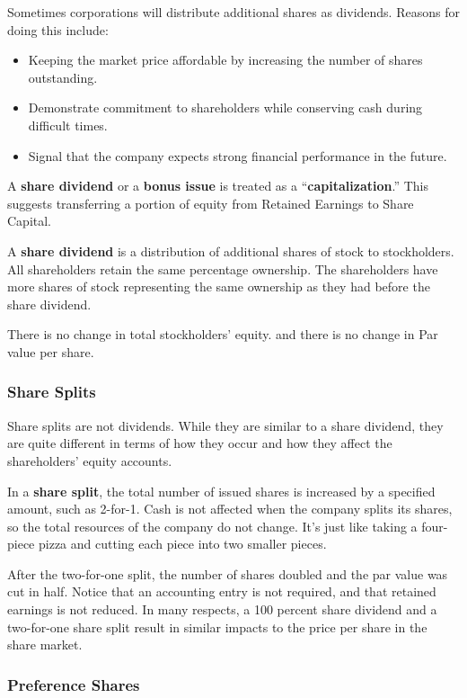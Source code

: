 \documentclass[../main.tex]{subfiles}
\begin{document}
	Sometimes corporations will distribute additional shares as dividends.  
	Reasons for doing this include:
	\begin{itemize}[noitemsep]
		\item Keeping the market price affordable by increasing the number of 
		shares outstanding.
		\item Demonstrate commitment to shareholders while conserving cash 
		during difficult times. 
		\item Signal that the company expects strong financial performance in 
		the future.
	\end{itemize}
	
	A \textbf{share dividend} or a \textbf{bonus issue} is treated as a 
	“\textbf{capitalization}.” This suggests transferring a portion of equity 
	from Retained Earnings to Share Capital.  
	
	A \textbf{share dividend} is a distribution of additional shares of stock 
	to stockholders. All shareholders retain the same percentage ownership. The 
	shareholders have more shares of stock representing the same ownership as 
	they had before the share dividend. 
	
	There is no change in total stockholders’ equity. and there is no change in 
	Par value per share.
	
	\subsubsection{Share Splits}
	
	Share splits are not dividends. While they are similar to a share dividend, 
	they are quite different in terms of how they occur and how they affect the 
	shareholders’ equity accounts. 
	
	In a \textbf{share split}, the total number of issued 
	shares is increased by a specified amount, such as 2-for-1. Cash is not 
	affected when the company splits its shares, so the total resources of the 
	company do not change. It’s just like taking a four-piece pizza and cutting 
	each piece into two smaller pieces.
	
	After the two-for-one split, the number of shares doubled and the par value 
	was cut in half. Notice that an accounting entry is not required, and that 
	retained earnings is not reduced. In many respects, a 100 percent share 
	dividend and a two-for-one share split result in similar impacts to the 
	price per share in the share market.
	
	\subsubsection{Preference Shares}
	
\end{document}
